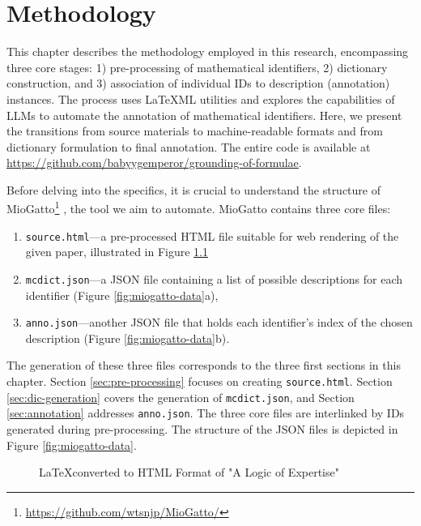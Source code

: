 \chapter{Methodology}\label{chapter:methods}

This chapter describes the methodology employed in this research, encompassing three core stages: 1) pre-processing of mathematical identifiers, 2) dictionary construction, and 3) association of individual IDs to description (annotation) instances.
The process uses \LaTeX ML utilities and explores the capabilities of \ac{LLMs} to automate the annotation of mathematical identifiers. Here, we present the transitions from source materials to machine-readable formats and from dictionary formulation to final annotation. The entire code is available at \url{https://github.com/babyygemperor/grounding-of-formulae}.

Before delving into the specifics, it is crucial to understand the structure of \\ MioGatto\footnote{\url{https://github.com/wtsnjp/MioGatto/}} \citep{asakura2021miogatto}, the tool we aim to automate. MioGatto contains three core files: 
\begin{enumerate}
    \item \texttt{source.html}—a pre-processed HTML file suitable for web rendering of the given paper, illustrated in Figure \ref{fig:miogatto-sources}
    \item \texttt{mcdict.json}—a JSON file containing a list of possible descriptions for each identifier (Figure \ref{fig:miogatto-data}a), 
    \item \texttt{anno.json}—another JSON file that holds each identifier's index of the chosen description (Figure \ref{fig:miogatto-data}b).
\end{enumerate}

The generation of these three files corresponds to the three first sections in this chapter. 
Section \ref{sec:pre-processing} focuses on creating \texttt{source.html}. 
Section \ref{sec:dic-generation} covers the generation of \texttt{mcdict.json}, and Section \ref{sec:annotation} addresses \texttt{anno.json}. The three core files are interlinked by IDs generated during pre-processing. The structure of the JSON files is depicted in Figure \ref{fig:miogatto-data}.

\begin{figure}[htpb]
  \centering
    \begin{minipage}{1\textwidth}
      
    \end{minipage}
  \caption[LaTeXML Pre-processing]{\LaTeX \space converted to HTML Format of "A Logic of Expertise" \citep{singleton2021logic}}\label{fig:miogatto-sources}
\end{figure}

